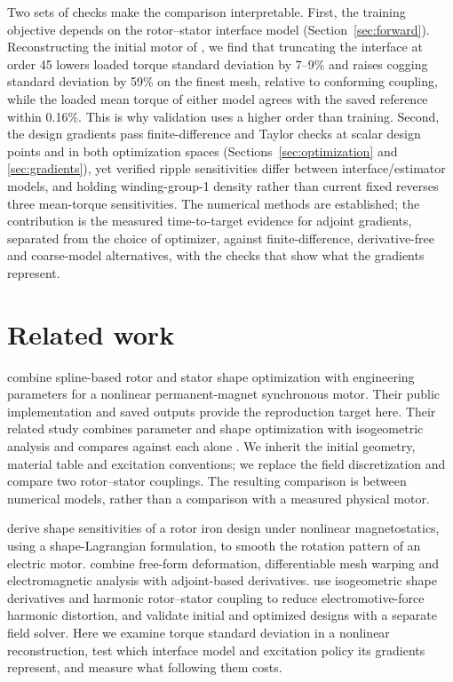 \documentclass{anvil-paper}
\begin{document}
Two sets of checks make the comparison interpretable. First, the training
objective depends on the rotor--stator interface model
(Section~\ref{sec:forward}). Reconstructing the initial motor of
\citet{wiesheu2024spline}, we find that truncating the interface at order 45
lowers loaded torque standard deviation by 7--9\% and raises cogging
standard deviation by 59\% on the finest mesh, relative to conforming
coupling, while the loaded mean torque of either model agrees with the
saved reference within 0.16\%. This is why validation uses a higher order
than training. Second, the design gradients pass finite-difference and
Taylor checks at scalar design points and in both optimization spaces
(Sections~\ref{sec:optimization} and \ref{sec:gradients}), yet verified
ripple sensitivities differ between interface/estimator models, and holding
winding-group-1 density rather than current fixed reverses three
mean-torque sensitivities. The numerical methods are established; the
contribution is the measured time-to-target evidence for adjoint gradients,
separated from the choice of optimizer, against finite-difference,
derivative-free and coarse-model alternatives, with the checks that show
what the gradients represent.

\section{Related work}
\citet{wiesheu2024spline} combine spline-based rotor and stator shape
optimization with engineering parameters for a nonlinear permanent-magnet
synchronous motor. Their public implementation and saved outputs provide
the reproduction target here. Their related study combines parameter and
shape optimization with isogeometric analysis and compares against each alone
\citep{wiesheu2025combined}. We inherit the initial geometry, material
table and excitation conventions; we replace the field discretization and compare two
rotor--stator couplings. The resulting comparison is between numerical
models, rather than a comparison with a measured physical motor.

\citet{gangl2015shape} derive shape sensitivities of a rotor iron design
under nonlinear magnetostatics, using a shape-Lagrangian formulation, to
smooth the rotation pattern of an electric motor.
\citet{scotzniovsky2025} combine free-form deformation, differentiable
mesh warping and electromagnetic analysis with adjoint-based derivatives.
\citet{merkel2021shape} use isogeometric shape derivatives and harmonic
rotor--stator coupling to reduce electromotive-force harmonic distortion,
and validate initial and optimized designs with a separate field solver.
Here we examine torque standard deviation in a nonlinear reconstruction,
test which interface model and excitation policy its gradients represent,
and measure what following them costs.
\end{document}
